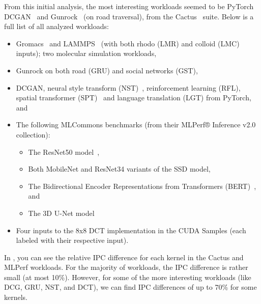 From this initial analysis, the most interesting workloads seemed to be PyTorch DCGAN~\cite{dcgan} and Gunrock~\cite{gru} (on road traversal), from the Cactus~\cite{cactus} suite.
Below is a full list of all analyzed workloads:
\begin{itemize}
    \item Gromacs~\cite{gromacs} and LAMMPS~\cite{LAMMPS} (with both rhodo (LMR) and colloid (LMC) inputs); two molecular simulation workloads,
    \item Gunrock on both road (GRU) and social networks (GST),
    \item DCGAN, neural style transform (NST)~\cite{nst}, reinforcement learning (RFL), spatial transformer (SPT)~\cite{spt} and language translation (LGT) from PyTorch, and
    \item The following MLCommons benchmarks (from their MLPerf® Inference v2.0 collection):
    \begin{itemize}
        \item The ResNet50 model~\cite{resnet50},
        \item Both MobileNet and ResNet34 variants of the SSD model,
        \item The Bidirectional Encoder Representations from Transformers (BERT)~\cite{bert}, and
        \item The 3D U-Net model~\cite{3d-unet}
    \end{itemize}
    \item Four inputs to the 8x8 DCT implementation in the CUDA Samples (each labeled with their respective input).
\end{itemize}

In , you can see the relative IPC difference for each kernel in the Cactus and MLPerf workloads.
For the majority of workloads, the IPC difference is rather small (at most 10\%).
However, for some of the more interesting workloads (like DCG, GRU, NST, and DCT), we can find IPC differences of up to 70\% for some kernels.
\FloatBarrier

